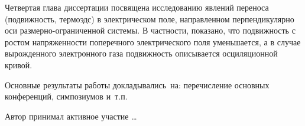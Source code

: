 Четвертая глава диссертации посвящена исследованию явлений переноса (подвижность, термоэдс) в электрическом поле, направленном перпендикулярно оси размерно-ограниченной системы. В частности, показано, что подвижность с ростом напряженности поперечного электрического поля уменьшается, а в случае вырожденного электронного газа подвижность описывается осциляционной кривой. 
%
%
%
%
%
%
%
%


{\probation}
Основные результаты работы докладывались~на:
перечисление основных конференций, симпозиумов и~т.\:п.

{\contribution} Автор принимал активное участие \ldots


